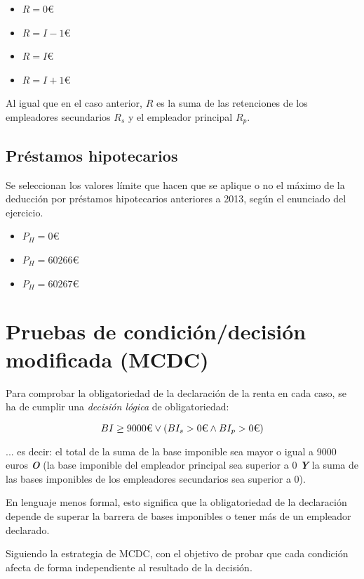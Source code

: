 \begin{itemize}
	\item $R = 0$€
	\item $R = I - 1$€
	\item $R = I$€
	\item $R = I + 1$€
\end{itemize}

Al igual que en el caso anterior, $R$ es la suma de las retenciones de los empleadores secundarios
$R_{s}$ y el empleador principal $R_{p}$.

\subsection{Préstamos hipotecarios}
Se seleccionan los valores límite que hacen que se aplique o no el máximo de la deducción por préstamos
hipotecarios anteriores a 2013, según el enunciado del ejercicio.

\begin{itemize}
	\item $P_{H} = 0$€
	\item $P_{H} = 60266$€
	\item $P_{H} = 60267$€
\end{itemize}

\newpage{}
\section{Pruebas de condición/decisión modificada (MCDC)}
Para comprobar la obligatoriedad de la declaración de la renta en cada caso,
se ha de cumplir una \textit{decisión lógica} de obligatoriedad:

$$
BI\geq 9000\textup{€} \lor (BI_{s} > 0\textup{€} \land BI_{p} > 0\textup{€})
$$

... es decir: el total de la suma de la base imponible sea mayor o igual a 9000 euros
\textbf{\textit{O}} (la base imponible del empleador principal sea superior a 0 \textbf{\textit{Y}}
la suma de las bases imponibles de los empleadores secundarios sea superior a 0).

En lenguaje menos formal, esto significa que la obligatoriedad de la declaración depende de
superar la barrera de bases imponibles o tener más de un empleador declarado.

Siguiendo la estrategia de MCDC, con el objetivo de probar que cada condición afecta de forma
independiente al resultado de la decisión.

